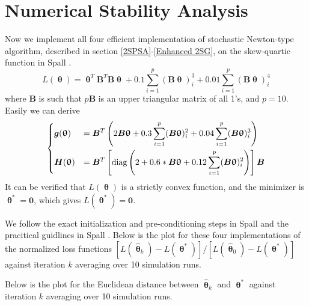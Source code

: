\documentclass[conference]{IEEEtran}
\newcommand{\htheta}{\bm{\hat{\uptheta}}}
\begin{document}


\section{Numerical Stability Analysis}
Now we implement all four efficient implementation of stochastic Newton-type algorithm, described in section \ref{2SPSA}-\ref{Enhanced 2SG}, on the skew-quartic function in Spall \cite{Spall2009}.
\begin{equation*}
L(\bm{\uptheta})=\bm{\uptheta}^{T}\bm{B}^{T}\bm{B}\bm{\uptheta}+0.1 \sum_{i=1}^{p}  (\bm{B}\bm{\uptheta})_i^3  +0.01 \sum_{i=1}^{p}  (\bm{B}\bm{\uptheta})_i^4
\end{equation*}
where $\bm{B}$ is such that $p\bm{B}$ is an upper triangular matrix of all 1's, and $p=10$. Easily we can derive
\begin{equation}
\begin{dcases}
	\bm{g}(\bm{\uptheta})&=\bm{B}^{T}\left( 2\bm{B}\bm{\uptheta}+0.3 \sum_{i=1}^{p}(\bm{B}\bm{\uptheta})_i^2 +0.04\sum_{i=1}^{p}(\bm{B}\bm{\uptheta})_i^3\right)\\
	\bm{H}(\bm{\uptheta})&=\bm{B}^{T}\left[\text{diag}\left(2+0.6*\bm{B}\bm{\uptheta}+0.12\sum_{i=1}^{p}(\bm{B}\bm{\uptheta})_i^2\right)\right]\bm{B}\\
\end{dcases}
\end{equation}
It can be verified that $L(\bm{\uptheta})$ is a strictly convex function, and the minimizer is $\bm{\uptheta}^{*}=\bm{0}$, which gives $L(\bm{\uptheta}^{*})=\bm{0}$.

We follow the exact initialization and pre-conditioning steps in Spall \cite{Spall2009} and the pracitical guidlines in Spall \cite{Spall2000}. Below is the plot for these four implementations of the normalized loss functions $[L(\htheta_k)-L(\bm{\uptheta}^{*})]/[L(\htheta_0)-L(\bm{\uptheta}^{*})]$ against iteration $k$ averaging over 10 simulation runs.


Below is the plot for the Euclidean distance between $\htheta_k$ and $\bm{\uptheta}^{*}$ against iteration $k$ averaging over 10 simulation runs.
\end{document}
